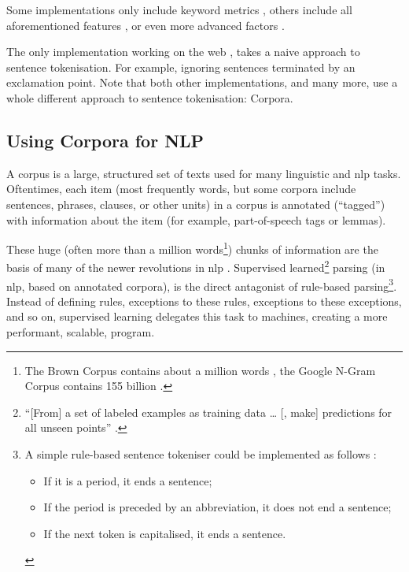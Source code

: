 Some implementations only include keyword metrics
\autocite{jbrooksuk/node-summary-source-code}, others include all
aforementioned features \autocite{MojoJolo/textteaser-source-code}, or
even more advanced factors \autocite{summly}.

The only implementation working on the web
\autocite{jbrooksuk/node-summary-source-code}, takes a naive approach to
sentence tokenisation. For example, ignoring sentences terminated by an
exclamation point. Note that both other implementations, and many more,
use a whole different approach to sentence tokenisation: Corpora.

\subsection{Using Corpora for NLP}\label{using-corpora-for}

A corpus is a large, structured set of texts used for many linguistic
and \gls{nlp} tasks. Oftentimes, each item (most frequently words, but
some corpora include sentences, phrases, clauses, or other units) in a
corpus is annotated (``tagged'') with information about the item (for
example, part-of-speech tags or lemmas).

These huge (often more than a million words\footnote{The Brown Corpus
  contains about a million words \autocite{francis-nelson-brown-corpus},
  the Google N-Gram Corpus contains 155 billion
  \autocite{brants-thorsten-google-ngram-corpus}.}) chunks of
information are the basis of many of the newer revolutions in \gls{nlp}
\autocite[see][]{mitkov-ruslan-ea-importance-corpora}. Supervised
learned\footnote{``{[}From{]} a set of labeled examples as training data
  \ldots{} {[}, make{]} predictions for all unseen points''
  \autocite{mohri-mehryar-foundations-machine-learning}.} parsing (in
\gls{nlp}, based on annotated corpora), is the direct antagonist of
rule-based parsing\footnote{A simple rule-based sentence tokeniser could
  be implemented as follows
  \autocite{attivio.com-doing-things-with-sentences}:

  \begin{itemize}
  \itemsep1pt\parskip0pt
  \item
    If it is a period, it ends a sentence;
  \item
    If the period is preceded by an abbreviation, it does not end a
    sentence;
  \item
    If the next token is capitalised, it ends a sentence.
  \end{itemize}}. Instead of defining rules, exceptions to these rules,
exceptions to these exceptions, and so on, supervised learning delegates
this task to machines, creating a more performant, scalable, program.

